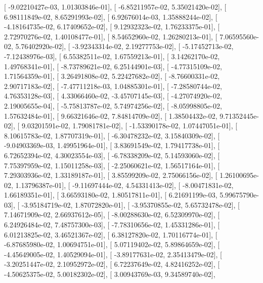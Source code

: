 \documentclass{article}
\begin{document}
       [ -9.02210427e-03,   1.01303846e-01],
       [ -6.85211957e-02,   5.35021420e-02],
       [  6.98111849e-02,   8.65291993e-02],
       [  6.92676014e-03,   1.35888244e-02],
       [ -4.18164735e-02,   6.17409652e-02],
       [  9.12932323e-02,   1.76233375e-01],
       [  2.72970276e-02,   1.40108477e-01],
       [  8.54652960e-02,   1.26280213e-01],
       [  7.06595560e-02,   5.76402920e-02],
       [ -3.92343314e-02,   2.19277753e-02],
       [ -5.17452713e-02,  -7.12438976e-03],
       [  6.55382511e-02,   1.67559213e-01],
       [  3.14262170e-02,   1.49768341e-01],
       [ -8.73789621e-02,   6.25144901e-03],
       [ -4.77315109e-02,   1.71564359e-01],
       [  3.26491808e-02,   5.22427682e-02],
       [ -8.76600331e-02,   2.90717183e-02],
       [ -7.47711218e-03,   1.04885301e-01],
       [ -7.28580744e-02,   4.76353128e-03],
       [  4.33066460e-02,  -3.45707145e-03],
       [ -4.27074920e-02,   2.19005655e-04],
       [ -5.75813787e-02,   5.74974256e-02],
       [ -8.05998805e-02,   1.57632484e-01],
       [  9.66321646e-02,   7.84814709e-02],
       [  1.38504432e-02,   9.71352445e-02],
       [  9.03201591e-02,   1.79081781e-02],
       [ -1.53390178e-02,   1.07447051e-01],
       [  8.10615783e-02,   1.87707319e-01],
       [ -6.30478232e-02,   3.15840309e-02],
       [ -9.04903369e-03,   1.49951964e-01],
       [  3.83691549e-02,   1.79417738e-01],
       [  6.72652394e-02,   4.30023554e-03],
       [ -6.78338209e-02,   5.14593060e-02],
       [  7.75397959e-02,   1.15011258e-03],
       [ -2.25060621e-02,   1.56517164e-01],
       [  7.29303936e-02,   1.33189187e-01],
       [  3.85599209e-02,   2.75066156e-02],
       [  1.26100695e-02,   1.13796387e-01],
       [ -9.11697444e-02,   4.54331413e-02],
       [ -8.00471831e-02,   1.66189351e-01],
       [  3.66593180e-02,   1.80517811e-01],
       [  6.21691199e-03,   5.99675790e-03],
       [ -3.95184719e-02,   1.87072820e-01],
       [ -3.95370855e-02,   5.65732478e-02],
       [  7.14671909e-02,   2.66937612e-05],
       [ -8.00288630e-02,   6.52309970e-02],
       [  6.24926484e-02,   7.48757300e-03],
       [ -7.78310656e-02,   1.45331286e-01],
       [  6.01213825e-02,   3.46521367e-02],
       [  6.38127820e-02,   1.70116774e-01],
       [ -6.87685980e-02,   1.00694751e-01],
       [  5.07119402e-02,   5.89864659e-02],
       [ -4.45649005e-02,   1.40529094e-01],
       [ -3.89177631e-02,   2.35413479e-02],
       [ -3.20251447e-02,   2.10952972e-02],
       [  6.72237649e-02,   4.82416252e-02],
       [ -4.50625375e-02,   5.00182302e-02],
       [  3.00943769e-03,   9.34589740e-02],
\end{document}
